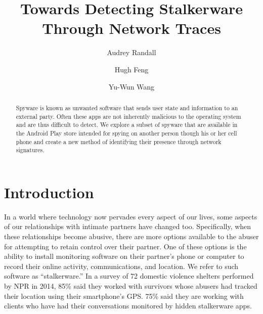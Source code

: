 \documentclass[acmtog]{acmart}
\begin{document}
\title{Towards Detecting Stalkerware Through Network Traces}


\author{Audrey Randall}
\author{Hugh Feng}
\author{Yu-Wun Wang}

\begin{abstract}
Spyware is known as unwanted software that sends user state and information to 
an external party. Often these apps are not inherently malicious to the 
operating system and are thus difficult to detect. We explore a subset of 
spyware that are available in the Android Play store intended for spying on 
another person though his or her cell phone and create a new method of 
identifying their presence through network signatures.  
\end{abstract}

\maketitle

\section{Introduction}
In a world where technology now pervades every aspect of our lives, some 
aspects of our relationships with intimate partners have changed too. 
Specifically, when these relationships become abusive, there are more options 
available to the abuser for attempting to retain control over their partner. 
One of these options is the ability to install monitoring software on their 
partner's phone or computer to record their online activity, communications, 
and location. We refer to such software as ``stalkerware.''  In a survey of 72 
domestic violence shelters performed by NPR in 2014, 85\% said they worked with 
survivors whose abusers had tracked their location using their smartphone's 
GPS. 75\% said they are working with clients who have had their conversations 
monitored by hidden stalkerware apps.\cite{shahani_smartphones}
\end{document}

